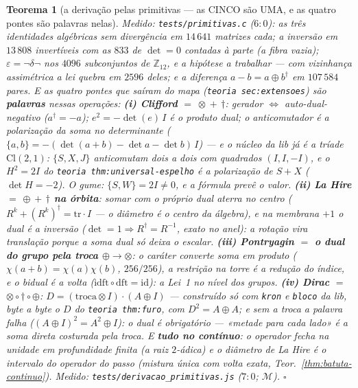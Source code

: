 \documentclass[11pt,a4paper]{article}
\newtheorem{teorema}{Teorema}
\newcommand{\code}[1]{\texttt{\small #1}}
\newcommand{\leitura}[1]{\code{#1}}
\begin{document}
\begin{teorema}[a derivação pelas primitivas --- as CINCO são UMA, e as
quatro pontes são palavras nelas]
\emph{Medido:} \code{tests/primitivas.c} ($6{:}0$): as três identidades
algébricas sem divergência em $14\,641$ matrizes cada; a inversão em
$13\,808$ invertíveis com as $833$ de $\det=0$ contadas à parte (a fibra
vazia); $\varepsilon=\neg\delta\neg$ nos $4096$ subconjuntos de
$\mathbb{Z}_{12}$, e a hipótese a trabalhar --- com vizinhança
\emph{assimétrica} a lei quebra em $2596$ deles; e a diferença
$a-b=a\oplus b^{\dagger}$ em $107\,584$ pares. E as
quatro pontes que saíram do mapa (\leitura{teoria sec:extensoes}) são
\textbf{palavras} nessas operações:
\textbf{(i) Clifford $=$ $\otimes$ $+$ $\dagger$}: gerador $\iff$
auto-dual-negativo ($a^{\dagger}=-a$); $e^{2}=-\det(e)\,I$ é o produto
dual; o anticomutador é a \emph{polarização da soma no determinante}
($\{a,b\}=-(\det(a{+}b)-\det a-\det b)\,I$) --- e o núcleo da lib
\emph{já é} a tríade $\mathrm{Cl}(2,1)$: $\{S,X,J\}$ anticomutam dois
a dois com quadrados $(I,I,-I)$, e o $H^{2}=2I$ do
\leitura{teoria thm:universal-espelho} é a polarização de $S{+}X$
($\det H=-2$). O gume: $\{S,W\}=2I\neq0$, e a fórmula \emph{prevê} o
valor.
\textbf{(ii) La Hire $=$ $\oplus$ $+$ $\dagger$ na órbita}: somar com
o próprio dual aterra no \emph{centro}
($R^{k}+(R^{k})^{\dagger}=\mathrm{tr}\cdot I$ --- o diâmetro é o
centro da álgebra), e na membrana $+1$ o dual é a inversão
($\det=1\Rightarrow R^{\dagger}=R^{-1}$, exato no anel): a rotação
vira translação porque a soma dual só deixa o escalar.
\textbf{(iii) Pontryagin $=$ o dual do grupo pela troca
$\oplus\to\otimes$}: o caráter converte soma em produto
($\chi(a{+}b)=\chi(a)\chi(b)$, $256/256$), a restrição na torre é a
redução do índice, e o \emph{bidual é a volta}
($\mathrm{idft}\circ\mathrm{dft}=\mathrm{id}$): a Lei~1 no nível dos
grupos.
\textbf{(iv) Dirac $=$ $\otimes\circ\dagger\circ\oplus$}:
$D=(\mathrm{troca}\otimes I)\cdot(A\oplus I)$ --- construído só com
\code{kron} e \code{bloco} da lib, byte a byte o $D$ do
\leitura{teoria thm:furo}, com $D^{2}=A\oplus A$; e \emph{sem a troca a
palavra falha} ($(A\oplus I)^{2}=A^{2}\oplus I$): o dual é
obrigatório --- «metade para cada lado» é a soma direta costurada
pela troca. E \textbf{tudo no contínuo}: o operador fecha na unidade
em profundidade finita (a raiz $2$-ádica) e o diâmetro de La Hire é o
intervalo do operador do passo (mistura única com volta exata,
Teor.~\ref{thm:batuta-continuo}).
\emph{Medido:} \code{tests/derivacao\_primitivas.js} ($7{:}0$;
$\mathcal{M}$).
$\square$
\end{teorema}
\end{document}
